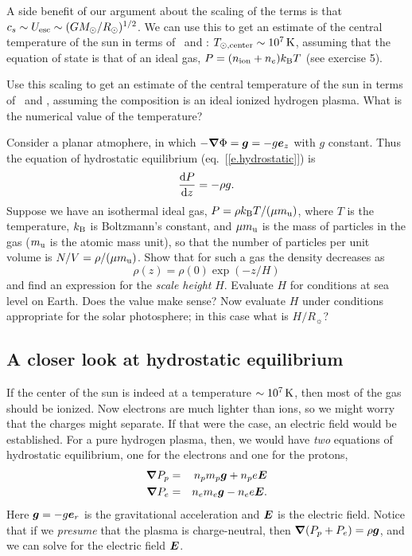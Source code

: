 A side benefit of our argument about the scaling of the terms is that $c_{s}\sim U_{\mathrm{esc}} \sim (GM_\odot/R_{\odot})^{1/2}$.  We can use this to get an estimate of the central temperature of the sun in terms of \Msun\ and \Rsun: $T_{\odot,\mathrm{center}}\sim 10^{7}\,\mathrm{K}$, assuming that the equation of state is that of an ideal gas, $P = (n_{\mathrm{ion}} + n_{e})k_\mathrm{B} T$ (see exercise 5). 

\begin{exercisebox}
Use this scaling to get an estimate of the central temperature of the sun in terms of \Msun\ and \Rsun, assuming the composition is an ideal ionized hydrogen plasma.  What is the numerical value of the temperature?
\end{exercisebox}

\begin{exercisebox}
Consider a planar atmophere, in which $-\boldsymbol{\nabla}\Phi = \boldsymbol{g} = -g \boldsymbol{e}_{z}$ with $g$ constant. Thus the equation of hydrostatic equilibrium (eq.~[\ref{e.hydrostatic}]) is
\begin{equation}\label{e.planar-hydrostatic}
\frac{\mathrm{d} P}{\mathrm{d} z} = -\rho g.
\end{equation}
Suppose we have an isothermal ideal gas, $P = \rho k_\mathrm{B} T/(\mu m_\mathrm{u})$, where $T$ is the temperature, $k_\mathrm{B}$ is Boltzmann's constant, and $\mu m_\mathrm{u}$ is the mass of particles in the gas ($m_\mathrm{u}$ is the atomic mass unit), so that the number of particles per unit volume is $N/V = \rho/(\mu m_\mathrm{u})$.  Show that for such a gas the density decreases as
\[
\rho(z) = \rho(0) \exp\left(-z/H\right)
\]
and find an expression for the \emph{scale height} $H$.  Evaluate $H$ for conditions at sea level on Earth. Does the value make sense? Now evaluate $H$ under conditions appropriate for the solar photosphere; in this case what is $H/R_{\sun}$?
\end{exercisebox}

\subsection{A closer look at hydrostatic equilibrium}
If the center of the sun is indeed at a temperature $\sim 10^{7}\,\mathrm{K}$, then most of the gas should be ionized. Now electrons are much lighter than ions, so we might worry that the charges might separate.  If that were the case, an electric field would be established.   For a pure hydrogen plasma, then, we would have \emph{two} equations of hydrostatic equilibrium, one for the electrons and one for the protons,
\begin{eqnarray}
\boldsymbol{\nabla} P_{p} &=& n_{p}m_{p} \boldsymbol{g}  +  n_{p}e\boldsymbol{E} \\
\boldsymbol{\nabla} P_{e} &=& n_{e}m_{e}\boldsymbol{g} - n_{e} e \boldsymbol{E}.
\end{eqnarray}
Here $\boldsymbol{g} = -g \boldsymbol{e}_{r}$ is the gravitational acceleration and $\boldsymbol{E}$ is the electric field. Notice that if we \emph{presume} that the plasma is charge-neutral, then $\boldsymbol{\nabla} (P_{p}+P_{e}) = \rho \boldsymbol{g}$, and we can solve for the electric field $\boldsymbol{E}$. 

